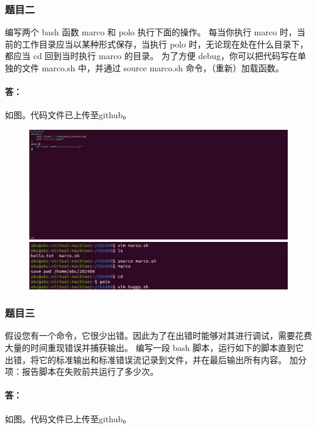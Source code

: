 \documentclass[a4paper, 12pt]{article}
\begin{document}
	\subsubsection{题目二}
	编写两个 bash 函数 marco 和 polo 执行下面的操作。 每当你执行 marco 时，当前的工作目录应当以某种形式保存，当执行 polo 时，无论现在处在什么目录下，都应当 cd 回到当时执行 marco 的目录。 为了方便 debug，你可以把代码写在单独的文件 marco.sh 中，并通过 source marco.sh 命令，（重新）加载函数。
	
	\paragraph{答：}
	如图。代码文件已上传至github。
	
	\begin{figure}[H]
		\centering
		\includegraphics[width=1\textwidth]{008.jpg}
		\includegraphics[width=1\textwidth]{009.jpg}
	\end{figure}
	
	\subsubsection{题目三}
	假设您有一个命令，它很少出错。因此为了在出错时能够对其进行调试，需要花费大量的时间重现错误并捕获输出。 编写一段 bash 脚本，运行如下的脚本直到它出错，将它的标准输出和标准错误流记录到文件，并在最后输出所有内容。 加分项：报告脚本在失败前共运行了多少次。
	
	\paragraph{答：}
	如图。代码文件已上传至github。
	
\end{document}

